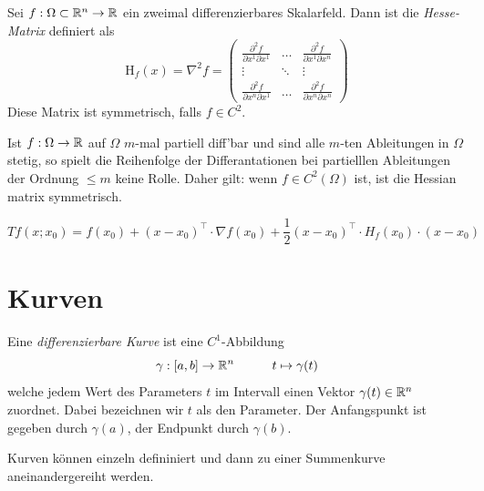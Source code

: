 \begin{definition}
    Sei $f:\Omega \subset \mathbb{R}^n \to \mathbb{R}$ ein zweimal differenzierbares Skalarfeld. Dann ist die \textit{Hesse-Matrix} definiert als
    $$ \mathrm{H}_f(x) = \nabla^2 f = \begin{pmatrix}
    \frac{\partial^2 f}{\partial x^1	\partial x^1} & \dots & \frac{\partial^2 f}{\partial 			x^1	\partial x^n} \\
    \vdots & \ddots & \vdots \\
    \frac{\partial^2 f}{\partial x^n	\partial x^1} & \dots & \frac{\partial^2 f}{\partial 			x^n	\partial x^n}
    \end{pmatrix}$$
    Diese Matrix ist symmetrisch, falls $f\in C^2$.
\end{definition}

\begin{theorem}
    Ist $f: \Omega \to \mathbb{R}$ auf $\Omega$ $m$-mal partiell diff'bar und sind alle $m$-ten Ableitungen in $\Omega$ stetig, so spielt die Reihenfolge der Differantationen bei partielllen Ableitungen der Ordnung $\leq m$ keine Rolle. Daher gilt: wenn $f \in C^2(\Omega)$ ist, ist die Hessian matrix symmetrisch.
\end{theorem}

\begin{theorem}
    $$ \mathit{Tf}(x; x_0) = f(x_0) + (x-x_0)^\top \cdot \nabla f(x_0) + \frac{1}{2} (x-x_0)^\top \cdot H_f(x_0) \cdot (x-x_0)$$
\end{theorem}

\section{Kurven}

\begin{definition}
    Eine \textit{differenzierbare Kurve} ist eine $C^1$-Abbildung
    $$ \gamma : [a,b] \to \mathbb{R}^n \quad \quad \quad t \mapsto \gamma(t)$$
    welche jedem Wert des Parameters $t$ im Intervall einen Vektor $\gamma(t) \in \mathbb{R}^n$ zuordnet.
    Dabei bezeichnen wir $t$ als den Parameter. Der Anfangspunkt ist gegeben durch $\gamma(a)$, der Endpunkt durch $\gamma(b)$.
\end{definition}

\begin{remark}
    Kurven können einzeln defininiert und dann zu einer Summenkurve aneinandergereiht werden.
\end{remark}

